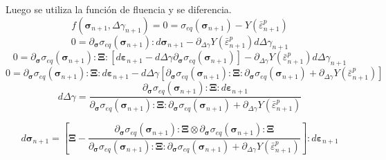 \documentclass[12pt]{article}
\begin{document}
Luego se utiliza la función de fluencia y se diferencia.
\[ f(\pmb{\sigma}_{n+1}, \Delta\gamma_{n+1}) = 0 = \sigma_{eq}\left(\pmb{\sigma}_{n+1}\right) - Y\left(\bar\varepsilon^p_{n+1}\right)\]
\[ 0 = \partial_{\pmb{\sigma}}\sigma_{eq}\left(\pmb{\sigma}_{n+1}\right):d\pmb{\sigma}_{n+1} - \partial_{\Delta\gamma} Y\left(\bar\varepsilon^p_{n+1}\right) d\Delta\gamma_{n+1}\]
\[ 0 = \partial_{\pmb{\sigma}}\sigma_{eq}\left(\pmb{\sigma}_{n+1}\right):\pmb{\Xi}:\left[d\pmb{\varepsilon}_{n+1} - d\Delta\gamma\partial_{\pmb{\sigma}}\sigma_{eq}\left(\pmb{\sigma}_{n+1}\right)\right] - \partial_{\Delta\gamma} Y\left(\bar\varepsilon^p_{n+1}\right) d\Delta\gamma_{n+1}\]
\[ 0 = \partial_{\pmb{\sigma}}\sigma_{eq}\left(\pmb{\sigma}_{n+1}\right):\pmb{\Xi}:d\pmb{\varepsilon}_{n+1} - d\Delta\gamma\left[\partial_{\pmb{\sigma}}\sigma_{eq}\left(\pmb{\sigma}_{n+1}\right):\pmb{\Xi}:\partial_{\pmb{\sigma}}\sigma_{eq}\left(\pmb{\sigma}_{n+1}\right) + \partial_{\Delta\gamma} Y\left(\bar\varepsilon^p_{n+1}\right)\right]\]
\[ d\Delta\gamma = \frac{\partial_{\pmb{\sigma}}\sigma_{eq}\left(\pmb{\sigma}_{n+1}\right):\pmb{\Xi}:d\pmb{\varepsilon}_{n+1} }{\partial_{\pmb{\sigma}}\sigma_{eq}\left(\pmb{\sigma}_{n+1}\right):\pmb{\Xi}:\partial_{\pmb{\sigma}}\sigma_{eq}\left(\pmb{\sigma}_{n+1}\right) + \partial_{\Delta\gamma} Y\left(\bar\varepsilon^p_{n+1}\right)}\]

\[d\pmb{\sigma}_{n+1} = \left[\pmb{\Xi} - \frac{\partial_{\pmb{\sigma}}\sigma_{eq}\left(\pmb{\sigma}_{n+1}\right):\pmb{\Xi} \otimes \partial_{\pmb{\sigma}}\sigma_{eq}\left(\pmb{\sigma}_{n+1}\right):\pmb{\Xi} }{\partial_{\pmb{\sigma}}\sigma_{eq}\left(\pmb{\sigma}_{n+1}\right):\pmb{\Xi}:\partial_{\pmb{\sigma}}\sigma_{eq}\left(\pmb{\sigma}_{n+1}\right) + \partial_{\Delta\gamma} Y\left(\bar\varepsilon^p_{n+1}\right)}\right] :d\pmb{\varepsilon}_{n+1} \]

\end{document}
